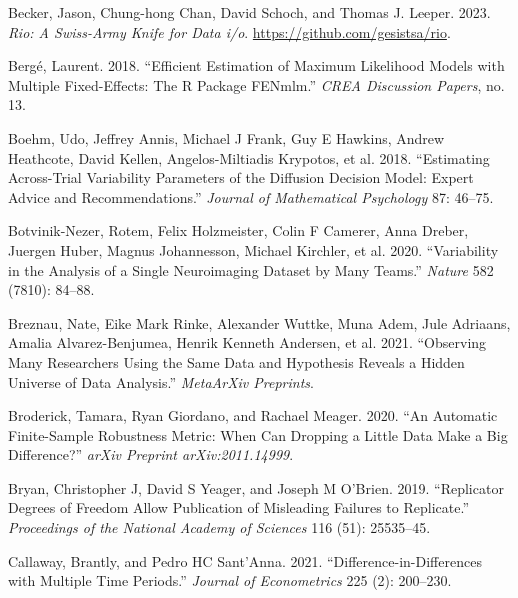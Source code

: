 \documentclass[
  letterpaper,
  DIV=11,
  numbers=noendperiod]{scrartcl}
\newlength{\cslhangindent}
\newlength{\cslentryspacingunit} %
\newenvironment{CSLReferences}[2] %
 {%
  \setlength{\parindent}{0pt}
  \ifodd #1
  \let\oldpar\par
  \def\par{\hangindent=\cslhangindent\oldpar}
  \fi
  \setlength{\parskip}{#2\cslentryspacingunit}
 }%
 {}
\begin{document}
\begin{CSLReferences}{1}{0}
\leavevmode{}%
Becker, Jason, Chung-hong Chan, David Schoch, and Thomas J. Leeper.
2023. \emph{Rio: A Swiss-Army Knife for Data i/o}.
\url{https://github.com/gesistsa/rio}.

\leavevmode{}%
Bergé, Laurent. 2018. {``Efficient Estimation of Maximum Likelihood
Models with Multiple Fixed-Effects: The {R} Package {FENmlm}.''}
\emph{CREA Discussion Papers}, no. 13.

\leavevmode{}%
Boehm, Udo, Jeffrey Annis, Michael J Frank, Guy E Hawkins, Andrew
Heathcote, David Kellen, Angelos-Miltiadis Krypotos, et al. 2018.
{``Estimating Across-Trial Variability Parameters of the Diffusion
Decision Model: Expert Advice and Recommendations.''} \emph{Journal of
Mathematical Psychology} 87: 46--75.

\leavevmode{}%
Botvinik-Nezer, Rotem, Felix Holzmeister, Colin F Camerer, Anna Dreber,
Juergen Huber, Magnus Johannesson, Michael Kirchler, et al. 2020.
{``Variability in the Analysis of a Single Neuroimaging Dataset by Many
Teams.''} \emph{Nature} 582 (7810): 84--88.

\leavevmode{}%
Breznau, Nate, Eike Mark Rinke, Alexander Wuttke, Muna Adem, Jule
Adriaans, Amalia Alvarez-Benjumea, Henrik Kenneth Andersen, et al. 2021.
{``Observing Many Researchers Using the Same Data and Hypothesis Reveals
a Hidden Universe of Data Analysis.''} \emph{MetaArXiv Preprints}.

\leavevmode{}%
Broderick, Tamara, Ryan Giordano, and Rachael Meager. 2020. {``An
Automatic Finite-Sample Robustness Metric: When Can Dropping a Little
Data Make a Big Difference?''} \emph{arXiv Preprint arXiv:2011.14999}.

\leavevmode{}%
Bryan, Christopher J, David S Yeager, and Joseph M O'Brien. 2019.
{``Replicator Degrees of Freedom Allow Publication of Misleading
Failures to Replicate.''} \emph{Proceedings of the National Academy of
Sciences} 116 (51): 25535--45.

\leavevmode{}%
Callaway, Brantly, and Pedro HC Sant'Anna. 2021.
{``Difference-in-Differences with Multiple Time Periods.''}
\emph{Journal of Econometrics} 225 (2): 200--230.


\end{CSLReferences}
\end{document}
